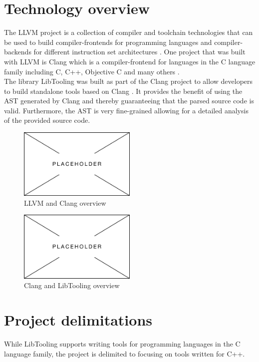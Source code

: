 \section{Technology overview}
The LLVM project is a collection of compiler and toolchain technologies that can be used to build compiler-frontends for programming languages and compiler-backends for different instruction set architectures \cite{llvmLLVMCompilerInfrastructure}.
One project that was built with LLVM is Clang which is a compiler-frontend for languages in the C language family including C, C++, Objective C and many others \cite{llvmClangLanguageFamily}.\\
The library LibTooling was built as part of the Clang project to allow developers to build standalone tools based on Clang \cite{llvmLibToolingClang17}. It provides the benefit of using the AST generated by Clang and thereby guaranteeing that the parsed source code is valid. Furthermore, the AST is very fine-grained allowing for a detailed analysis of the provided source code.


\begin{figure}[H]
    \centering
    \includegraphics[width=0.5\textwidth]{figs/040des/placeholder.png}
    \caption{LLVM and Clang overview}
    \label{fig:040des:llvmToolchainOverview}
\end{figure}

\begin{figure}[H]
    \centering
    \includegraphics[width=0.5\textwidth]{figs/040des/placeholder.png}
    \caption{Clang and LibTooling overview}
    \label{fig:040des:clangToolingOverview}
\end{figure}


\section{Project delimitations}
While LibTooling supports writing tools for programming languages in the C language family, the project is delimited to focusing on tools written for C++.

